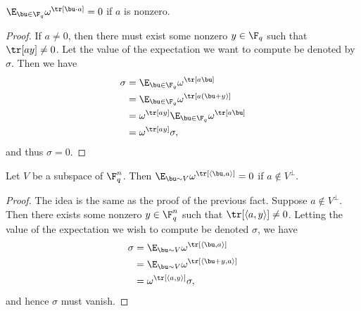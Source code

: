 \begin{fact}\label{fact:averages-to-zero}
$\E_{\bu \in \F_q} \omega^{\tr[\bu \cdot a]} = 0$ if $a$ is nonzero.
\end{fact}
\begin{proof}
  If $a \neq 0$, then there must exist some nonzero $y \in \F_q$ such that
  $\tr[ay] \neq 0$. Let the value of the expectation we want to compute be
  denoted by $\sigma$. Then we have
  \begin{align*}
    \sigma &= \E_{\bu \in \F_q} \omega^{\tr[a \bu]} \\
           &= \E_{\bu \in \F_q} \omega^{\tr[a(\bu + y)]} \\
           &= \omega^{\tr[ay]} \E_{\bu \in \F_q}\omega^{\tr[a\bu]} \\
           &= \omega^{\tr[ay]} \sigma,
  \end{align*}
    and thus $\sigma = 0$.
  \end{proof}

  \begin{fact}\label{fact:averages-to-zero-subspace}
    Let $V$ be a subspace of $\F_q^n$. Then $\E_{\bu \sim V}
    \omega^{\tr[\langle \bu, a \rangle]} = 0$ if $a \notin V^\perp$.
  \end{fact}
  \begin{proof}
    The idea is the same as the proof of the previous fact. Suppose $a
    \notin V^\perp$. Then there exists some nonzero $y \in \F_q^n$
    such that $\tr[\langle a, y \rangle] \neq 0$. Letting the value of
    the expectation we wish to compute be denoted $\sigma$, we have
    \begin{align*}
      \sigma &= \E_{\bu \sim V} \omega^{\tr[\langle \bu, a \rangle]}
      \\
             &= \E_{\bu \sim V} \omega^{\tr[ \langle \bu + y,
               a\rangle]} \\
             &= \omega^{\tr[\langle a, y\rangle]} \sigma,
    \end{align*}
    and hence $\sigma $ must vanish.
  \end{proof}
  


